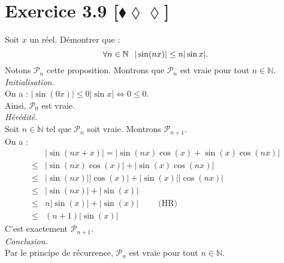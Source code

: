 \documentclass[10pt]{article}
\begin{document}

\section*{Exercice 3.9 [$\blacklozenge\lozenge\lozenge$]}
\begin{tcolorbox}[enhanced, width=6in, center, size=fbox, fontupper=\large, drop shadow southwest]
    Soit $x$ un réel. Démontrer que :
    \begin{equation*}
        \forall{n\in\mathbb{N}}\hspace{0.25cm} |\sin(nx)|\leq n|\sin x|.
    \end{equation*}
    Notons $\mathcal{P}_n$ cette proposition. Montrons que $\mathcal{P}_n$ est vraie pour tout $n\in\mathbb{N}$.\\
    \emph{Initialisation}.\\
    On a : $|\sin(0x)|\leq0|\sin x| \iff 0 \leq 0$.\\
    Ainsi, $\mathcal{P}_0$ est vraie.\\
    \emph{Hérédité}.\\
    Soit $n\in\mathbb{N}$ tel que $\mathcal{P}_n$ soit vraie. Montrons $\mathcal{P}_{n+1}$.\\
    On a :
    \begin{align*}
        &|\sin(nx+x)|=|\sin(nx)\cos(x)+\sin(x)\cos(nx)|\\
        \leq&|\sin(nx)\cos(x)|+|\sin(x)\cos(nx)|\\
        \leq&|\sin(nx)||\cos(x)|+|\sin(x)||\cos(nx)|\\
        \leq&|\sin(nx)|+|\sin(x)|\\
        \leq&n|\sin(x)|+|\sin(x)| \hspace{1cm}\text{(HR)}\\
        \leq&(n+1)|\sin(x)|
    \end{align*} 
    C'est exactement $\mathcal{P}_{n+1}$.\\
    \emph{Conclusion.}\\
    Par le principe de récurrence, $\mathcal{P}_n$ est vraie pour tout $n\in\mathbb{N}$.
\end{tcolorbox}

\end{document}
